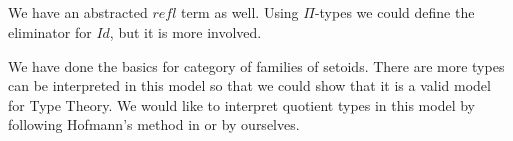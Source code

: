 \begin{code}
\\
\>[10]\<[11]%
\>[11]\AgdaSymbol{\}}\<%
\\
%
\\
\> \AgdaSymbol{:} \AgdaSymbol{\{} \AgdaSymbol{:} \AgdaSymbol{\}(} \AgdaSymbol{:}  \AgdaSymbol{)} \<[29]%
\>[29]\<%
\\
\>[-6]\<[7]%
\>[7]  \AgdaSymbol{\{}\AgdaSymbol{\}} \AgdaSymbol{(}  \AgdaSymbol{(}  \<[29]%
\>[29]\<%
\\
\>[0]\<[10]%
\>[10]\AgdaFunction{[}   \AgdaFunction{]T}\AgdaSymbol{)} \AgdaSymbol{)}\<%
\\
\> \AgdaSymbol{\{}\AgdaSymbol{\}}  \AgdaSymbol{=} \<[16]%
\>[16] \AgdaSymbol{\{}\AgdaSymbol{\}} \AgdaSymbol{\{}\AgdaSymbol{\}} \AgdaSymbol{(} \AgdaSymbol{)}\<%
\\
%
\\
%
\\
\>\<\end{code}

We have an abstracted $refl$ term as well. Using $\Pi$-types we could define the eliminator for $Id$, but it is more involved.

We have done the basics for category of families of setoids. There are more types can be interpreted in this model so that we could show that it is a valid model for Type Theory. We would like to interpret quotient types in this model by following Hofmann's method in \cite{hof:95:sm} or by ourselves.


